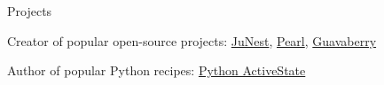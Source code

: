 \begin{cvlist}{Projects}
  \item[\textbullet] Creator of popular open-source projects:
  \href{https://github.com/fsquillace/junest}{JuNest}, \href{https://github.com/pearl-core/pearl}{Pearl}, \href{https://github.com/guavaberry/guavaberry}{Guavaberry}
  \item[\textbullet] Author of popular Python recipes:
  \href{https://code.activestate.com/recipes/users/4174931/}{Python ActiveState}
\end{cvlist}
